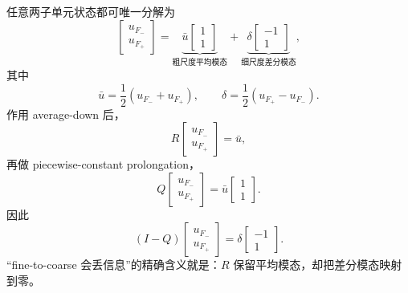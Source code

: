 任意两子单元状态都可唯一分解为
\begin{equation}
\begin{bmatrix}
u_{F_-}\\u_{F_+}
\end{bmatrix}
=
\underbrace{
\bar u
\begin{bmatrix}1\\1\end{bmatrix}}_{\text{粗尺度平均模态}}
+
\underbrace{
\delta
\begin{bmatrix}-1\\1\end{bmatrix}}_{\text{细尺度差分模态}},
\label{eq:amr-fine-mean-detail-decomposition}
\end{equation}
其中
\begin{equation}
\bar u=\frac12(u_{F_-}+u_{F_+}),
\qquad
\delta=\frac12(u_{F_+}-u_{F_-}).
\end{equation}
作用 average-down 后，
\begin{equation}
R
\begin{bmatrix}
u_{F_-}\\u_{F_+}
\end{bmatrix}
=
\bar u,
\label{eq:amr-average-removes-detail}
\end{equation}
再做 piecewise-constant prolongation，
\begin{equation}
Q
\begin{bmatrix}
u_{F_-}\\u_{F_+}
\end{bmatrix}
=
\bar u
\begin{bmatrix}1\\1\end{bmatrix}.
\label{eq:amr-projector-keeps-mean}
\end{equation}
因此
\begin{equation}
(I-Q)
\begin{bmatrix}
u_{F_-}\\u_{F_+}
\end{bmatrix}
=
\delta
\begin{bmatrix}-1\\1\end{bmatrix}.
\label{eq:amr-projector-detail-space}
\end{equation}
“fine-to-coarse 会丢信息”的精确含义就是：$R$ 保留平均模态，却把差分模态映射到零。

